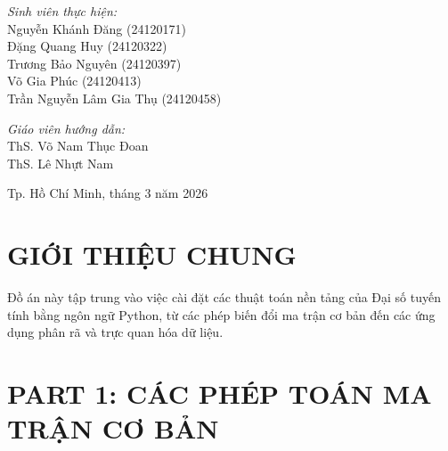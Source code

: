 \documentclass[a4paper,12pt]{article}
\begin{document}
\begin{titlepage}
    \vspace{2cm}

\vspace{1cm} %

\noindent %
\begin{minipage}[t]{0.6\textwidth} %
    \textit{Sinh viên thực hiện:} \\[6pt] %
    Nguyễn Khánh Đăng (24120171) \\[4pt]
    Đặng Quang Huy (24120322) \\[4pt]
    Trương Bảo Nguyên (24120397) \\[4pt]
    Võ Gia Phúc (24120413) \\[4pt]
    Trần Nguyễn Lâm Gia Thụ (24120458)
    
\end{minipage}%
\hfill %
\begin{minipage}[t]{0.35\textwidth} %
    \raggedleft %
    \textit{Giáo viên hướng dẫn:} \\[6pt]
    ThS. Võ Nam Thục Đoan \\[6pt]
    ThS. Lê Nhựt Nam
\end{minipage}
    
    

    \vfill
    
    {\large Tp. Hồ Chí Minh, tháng 3 năm 2026}
\end{titlepage}

\newpage
\tableofcontents

\newpage
\listoffigures %

\newpage
\listoftables  %
\newpage


\section{GIỚI THIỆU CHUNG}
Đồ án này tập trung vào việc cài đặt các thuật toán nền tảng của Đại số tuyến tính bằng ngôn ngữ Python, từ các phép biến đổi ma trận cơ bản đến các ứng dụng phân rã và trực quan hóa dữ liệu.

\section{PART 1: CÁC PHÉP TOÁN MA TRẬN CƠ BẢN}
\end{document}
